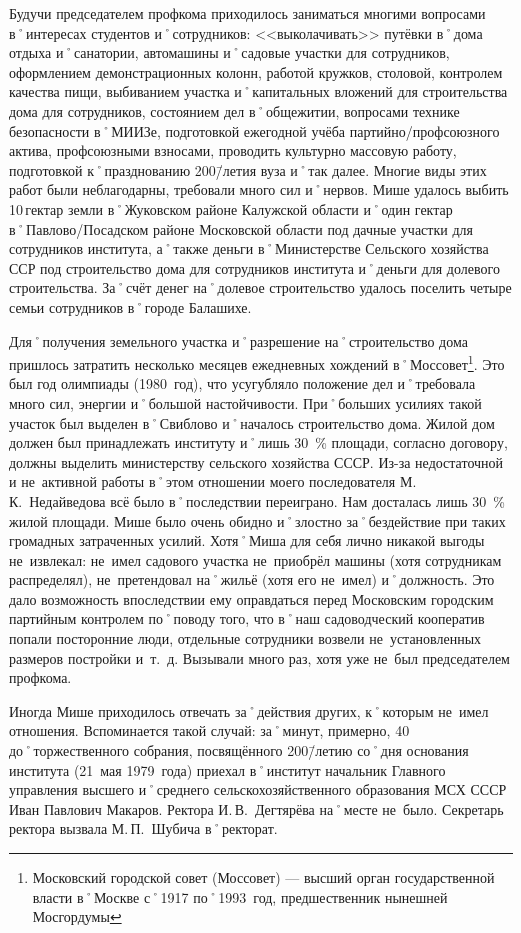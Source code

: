 Будучи председателем профкома приходилось заниматься многими вопросами в˚интересах студентов и˚сотрудников: <<выколачивать>> путёвки в˚дома отдыха и˚санатории, автомашины и˚садовые участки для сотрудников, оформлением демонстрационных колонн, работой кружков, столовой, контролем качества пищи, выбиванием участка и˚капитальных вложений для строительства дома для сотрудников, состоянием дел в˚общежитии, вопросами технике безопасности в˚МИИЗе, подготовкой ежегодной учёба партийно\-/профсоюзного актива, профсоюзными взносами, проводить культурно массовую работу, подготовкой к˚празднованию 200\=/летия вуза и˚так далее. Многие виды этих работ были неблагодарны, требовали много сил и˚нервов. Мише удалось выбить 10\,гектар земли в˚Жуковском районе Калужской области и˚один гектар в˚Павлово\-/Посадском районе Московской области под дачные участки для сотрудников института, а˚также деньги в˚Министерстве Сельского хозяйства ССР под строительство дома для сотрудников института и˚деньги для долевого строительства. За˚счёт денег на˚долевое строительство удалось поселить четыре семьи сотрудников в˚городе Балашихе.

Для˚получения земельного участка и˚разрешение на˚строительство дома пришлось затратить несколько месяцев ежедневных хождений в˚Моссовет\footnote{Московский городской совет (Моссовет) — высший орган государственной власти в˚Москве с˚1917 по˚1993~год, предшественник нынешней Мосгордумы}. Это был год олимпиады (1980~год), что усугубляло положение дел и˚требовала много сил, энергии и˚большой настойчивости. При˚больших усилиях такой участок был выделен в˚Свиблово и˚началось строительство дома. Жилой дом должен был принадлежать институту и˚лишь 30~\% площади, согласно договору, должны выделить министерству сельского хозяйства СССР. Из-за недостаточной и не~активной работы в˚этом отношении моего последователя М.\,К.~Недайведова всё было в˚последствии переиграно. Нам досталась лишь 30~\% жилой площади. Мише было очень обидно и˚злостно за˚бездействие при таких громадных затраченных усилий. Хотя˚Миша для себя лично никакой выгоды не~извлекал: не~имел садового участка не~приобрёл машины (хотя сотрудникам распределял), не~претендовал на˚жильё (хотя его не~имел) и˚должность. Это дало возможность впоследствии ему оправдаться перед Московским городским партийным контролем по˚поводу того, что в˚наш садоводческий кооператив попали посторонние люди, отдельные сотрудники возвели не~установленных размеров постройки и~т.~д. Вызывали много раз, хотя уже не~был председателем профкома.

Иногда Мише приходилось отвечать за˚действия других, к˚которым не~имел отношения. Вспоминается такой случай: за˚минут, примерно, 40 до˚торжественного собрания, посвящённого 200\=/летию со˚дня основания института (21~мая 1979~года) приехал в˚институт начальник Главного управления высшего и˚среднего сельскохозяйственного образования МСХ СССР Иван Павлович Макаров. Ректора И.\,В.~Дегтярёва на˚месте не~было. Секретарь ректора вызвала М.\,П.~Шубича в˚ректорат.

